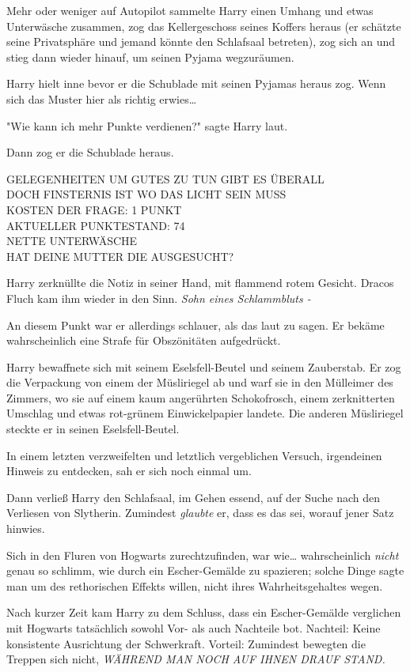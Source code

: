 {Mehr oder weniger auf Autopilot sammelte Harry einen Umhang und etwas Unterwäsche zusammen, zog das Kellergeschoss seines Koffers heraus (er schätzte seine Privatsphäre und jemand könnte den Schlafsaal betreten), zog sich an und stieg dann wieder hinauf, um seinen Pyjama wegzuräumen.

Harry hielt inne bevor er die Schublade mit seinen Pyjamas heraus zog. Wenn sich das Muster hier als richtig erwies…

"Wie kann ich mehr Punkte verdienen?" sagte Harry laut.

Dann zog er die Schublade heraus.

GELEGENHEITEN UM GUTES ZU TUN GIBT ES ÜBERALL\\ DOCH FINSTERNIS IST WO DAS LICHT SEIN MUSS\\ KOSTEN DER FRAGE: 1 PUNKT\\ AKTUELLER PUNKTESTAND: 74\\ NETTE UNTERWÄSCHE\\ HAT DEINE MUTTER DIE AUSGESUCHT?

Harry zerknüllte die Notiz in seiner Hand, mit flammend rotem Gesicht. Dracos Fluch kam ihm wieder in den Sinn. \emph{Sohn eines Schlammbluts -}

An diesem Punkt war er allerdings schlauer, als das laut zu sagen. Er bekäme wahrscheinlich eine Strafe für Obszönitäten aufgedrückt.

Harry bewaffnete sich mit seinem Eselsfell-Beutel und seinem Zauberstab. Er zog die Verpackung von einem der Müsliriegel ab und warf sie in den Mülleimer des Zimmers, wo sie auf einem kaum angerührten Schokofrosch, einem zerknitterten Umschlag und etwas rot-grünem Einwickelpapier landete. Die anderen Müsliriegel steckte er in seinen Eselsfell-Beutel.

In einem letzten verzweifelten und letztlich vergeblichen Versuch, irgendeinen Hinweis zu entdecken, sah er sich noch einmal um.

Dann verließ Harry den Schlafsaal, im Gehen essend, auf der Suche nach den Verliesen von Slytherin. Zumindest \emph{glaubte} er, dass es das sei, worauf jener Satz hinwies.

Sich in den Fluren von Hogwarts zurechtzufinden, war wie… wahrscheinlich \emph{nicht} genau so schlimm, wie durch ein Escher-Gemälde zu spazieren; solche Dinge sagte man um des rethorischen Effekts willen, nicht ihres Wahrheitsgehaltes wegen.

Nach kurzer Zeit kam Harry zu dem Schluss, dass ein Escher-Gemälde verglichen mit Hogwarts tatsächlich sowohl Vor- als auch Nachteile bot. Nachteil: Keine konsistente Ausrichtung der Schwerkraft. Vorteil: Zumindest bewegten die Treppen sich nicht, \emph{WÄHREND MAN NOCH AUF IHNEN DRAUF STAND.}

}
